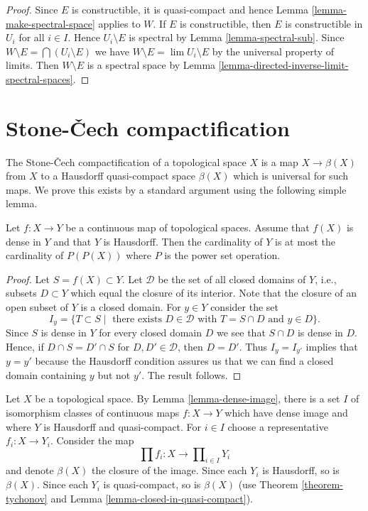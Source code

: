 \begin{proof}
Since $E$ is constructible, it is quasi-compact and hence
Lemma \ref{lemma-make-spectral-space} applies to $W$.
If $E$ is constructible, then $E$ is constructible in $U_i$
for all $i \in I$. Hence $U_i \setminus E$
is spectral by Lemma \ref{lemma-spectral-sub}.
Since $W \setminus E = \bigcap (U_i \setminus E)$ we have
$W \setminus E = \lim U_i \setminus E$ by the universal property of limits.
Then $W \setminus E$ is a spectral space by
Lemma \ref{lemma-directed-inverse-limit-spectral-spaces}.
\end{proof}






\section{Stone-{\v C}ech compactification}
\label{section-stone-cech}

\noindent
The Stone-{\v C}ech compactification of a topological space $X$
is a map $X \to \beta(X)$ from $X$ to a Hausdorff quasi-compact space
$\beta(X)$ which is universal for such maps. We prove this exists
by a standard argument using the following simple lemma.

\begin{lemma}
\label{lemma-dense-image}
Let $f : X \to Y$ be a continuous map of topological spaces. Assume that
$f(X)$ is dense in $Y$ and that $Y$ is Hausdorff. Then the cardinality
of $Y$ is at most the cardinality of $P(P(X))$ where $P$ is the power
set operation.
\end{lemma}

\begin{proof}
Let $S = f(X) \subset Y$. Let $\mathcal{D}$ be the set of all
closed domains of $Y$, i.e., subsets $D \subset Y$ which
equal the closure of its interior. Note that the closure of an
open subset of $Y$ is a closed domain. For $y \in Y$ consider the set
$$
I_y = \{T \subset S \mid \text{ there exists }
D \in \mathcal{D}\text{ with }T = S \cap D\text{ and }y \in D\}.
$$
Since $S$ is dense in $Y$ for every closed domain $D$ we see
that $S \cap D$ is dense in $D$. Hence, if
$D \cap S = D' \cap S$ for $D, D' \in \mathcal{D}$, then
$D = D'$. Thus $I_y = I_{y'}$ implies that $y = y'$ because the
Hausdorff condition assures us that we can find a closed domain
containing $y$ but not $y'$. The result follows.
\end{proof}

\noindent
Let $X$ be a topological space. By Lemma \ref{lemma-dense-image}, there
is a set $I$
of isomorphism classes of continuous maps $f : X \to Y$ which have dense
image and where $Y$ is Hausdorff and quasi-compact. For $i \in I$ choose a
representative $f_i : X \to Y_i$. Consider the map
$$
\prod f_i : X \longrightarrow \prod\nolimits_{i \in I} Y_i
$$
and denote $\beta(X)$ the closure of the image. Since each $Y_i$ is
Hausdorff, so is $\beta(X)$. Since each $Y_i$ is quasi-compact, so
is $\beta(X)$ (use Theorem \ref{theorem-tychonov} and
Lemma \ref{lemma-closed-in-quasi-compact}).

